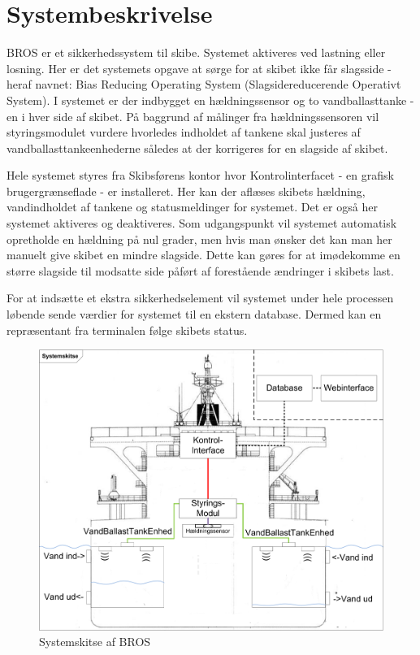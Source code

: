 \chapter{Systembeskrivelse}
\label{ch:Systembeskrivelse}
BROS er et sikkerhedssystem til skibe. Systemet aktiveres ved lastning eller losning. Her er det systemets opgave at sørge for at skibet ikke får slagsside - heraf navnet: Bias Reducing Operating System (Slagsidereducerende Operativt System).
I systemet er der indbygget en hældningssensor og to vandballasttanke - en i hver side af skibet. På baggrund af målinger fra hældningssensoren vil styringsmodulet vurdere hvorledes indholdet af tankene skal justeres af vandballasttankeenhederne således at der korrigeres for en slagside af skibet.

Hele systemet styres fra Skibsførens kontor hvor Kontrolinterfacet - en grafisk brugergrænseflade - er installeret. Her kan der aflæses skibets hældning, vandindholdet af tankene og statusmeldinger for systemet. Det er også her systemet aktiveres og deaktiveres.
Som udgangspunkt vil systemet automatisk opretholde en hældning på nul grader, men hvis man ønsker det kan man her manuelt give skibet en mindre slagside. Dette kan gøres for at imødekomme en større slagside til modsatte side påført af forestående ændringer i skibets last.

For at indsætte et ekstra sikkerhedselement vil systemet under hele processen løbende sende værdier for systemet til en ekstern database. Dermed kan en repræsentant fra terminalen følge skibets status.

\begin{figure}[H]
\centering
\includegraphics[width = .72\textwidth]{billeder/systemfigur}
\caption{Systemskitse af BROS}
\label{fig:systemskitse}
\end{figure}
